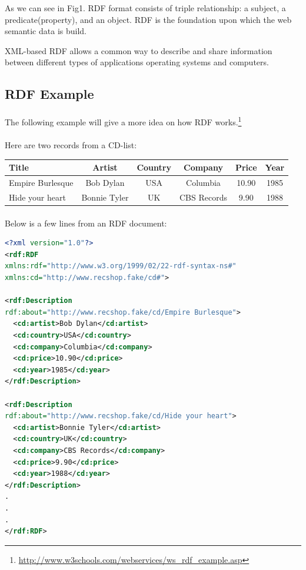 \documentclass[a4paper,11pt]{report}
\begin{document}
As we can see in Fig1. RDF format consists of triple relationship: a subject, a predicate(property), and an object. RDF is the foundation upon which the web semantic data is build.

XML-based RDF allows a common way to describe and share information between different types of applications operating systems and computers.
 

\subsection{RDF Example}
\paragraph{}
The following example will give a more idea on how RDF works.\footnote{\url{
http://www.w3schools.com/webservices/ws_rdf_example.asp}}
 
 \paragraph{}
Here are two records from a CD-list:
 
\begin{center} 
\begin{tabular}{ | l | c | c | c | c | c |}
 \hline
 Title & Artist & Country & Company & Price & Year \\ \hline
 Empire Burlesque & Bob Dylan & USA &	Columbia & 10.90 &	1985 \\
 \hline
  Hide your heart & Bonnie Tyler & UK &	CBS Records &9.90 &	1988 \\
 \hline
\end{tabular}
\end{center}

\paragraph{}
Below is a few lines from an RDF document:

\begin{lstlisting}[language=XML]
<?xml version="1.0"?>
<rdf:RDF
xmlns:rdf="http://www.w3.org/1999/02/22-rdf-syntax-ns#"
xmlns:cd="http://www.recshop.fake/cd#">

<rdf:Description
rdf:about="http://www.recshop.fake/cd/Empire Burlesque">
  <cd:artist>Bob Dylan</cd:artist>
  <cd:country>USA</cd:country>
  <cd:company>Columbia</cd:company>
  <cd:price>10.90</cd:price>
  <cd:year>1985</cd:year>
</rdf:Description>

<rdf:Description
rdf:about="http://www.recshop.fake/cd/Hide your heart">
  <cd:artist>Bonnie Tyler</cd:artist>
  <cd:country>UK</cd:country>
  <cd:company>CBS Records</cd:company>
  <cd:price>9.90</cd:price>
  <cd:year>1988</cd:year>
</rdf:Description>
.
.
.
</rdf:RDF> 


\end{lstlisting}
\end{document}
